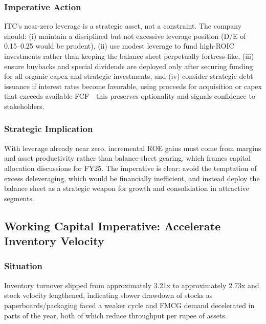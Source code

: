 \documentclass[12pt, a4paper]{report}
\begin{document}
\subsubsection{Imperative Action}
ITC's near-zero leverage is a strategic asset, not a constraint. The company should: (i) maintain a disciplined but not excessive leverage position (D/E of 0.15–0.25 would be prudent), (ii) use modest leverage to fund high-ROIC investments rather than keeping the balance sheet perpetually fortress-like, (iii) ensure buybacks and special dividends are deployed only after securing funding for all organic capex and strategic investments, and (iv) consider strategic debt issuance if interest rates become favorable, using proceeds for acquisition or capex that exceeds available FCF—this preserves optionality and signals confidence to stakeholders.

\subsubsection{Strategic Implication}
With leverage already near zero, incremental ROE gains must come from margins and asset productivity rather than balance-sheet gearing, which frames capital allocation discussions for FY25. The imperative is clear: avoid the temptation of excess deleveraging, which would be financially inefficient, and instead deploy the balance sheet as a strategic weapon for growth and consolidation in attractive segments.

\subsection{Working Capital Imperative: Accelerate Inventory Velocity}

\subsubsection{Situation}
Inventory turnover slipped from approximately 3.21x to approximately 2.73x and stock velocity lengthened, indicating slower drawdown of stocks as paperboards/packaging faced a weaker cycle and FMCG demand decelerated in parts of the year, both of which reduce throughput per rupee of assets.
\end{document}
